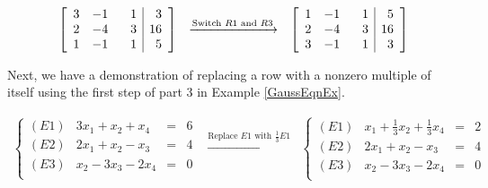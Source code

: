 \documentclass{ximera}
\begin{document}
\[\begin{array}{ccc}

\left[ \begin{array}{rrr|r} 
3 & -1 & \hphantom{-}1 & 3 \\ 
2 & -4 & 3 & 16 \\ 
1 & -1 & 1 & 5  \\
\end{array} \right]

&
\xrightarrow{\text{Switch $R1$ and $R3$}}

&

\left[ \begin{array}{rrr|r} 
1 & -1 & \hphantom{-}1 & 5  \\
2 & -4 & 3 & 16 \\ 
3 & -1 & 1 & 3 \\ 

\end{array} \right]

\end{array}\]

Next, we have a demonstration of replacing a row with a nonzero multiple of itself using the first step of part 3 in Example \ref{GaussEqnEx}.

 \[\begin{array}{ccc}

\left\{ 

\begin{array}{lrcr}

(E1) & 3x_1 +x_2 + x_4 & = & 6 \\   
(E2) & 2x_1 + x_2 -x_3  & = & 4  \\
(E3) &  x_2 -3x_3 -2x_4 & = & 0 \\

\end{array} 

\right.

&
\xrightarrow{\text{Replace $E1$ with $\frac{1}{3}E1$}}

&

\left\{ 

\begin{array}{lrcr}

(E1) & x_1 + \frac{1}{3}x_2 + \frac{1}{3}x_4 & = & 2 \\  
(E2) & 2x_1 + x_2 -x_3  & = & 4  \\
(E3) &  x_2 -3x_3 -2x_4 & = & 0 \\

\end{array} 

\right.

\end{array}\]
\end{document}
